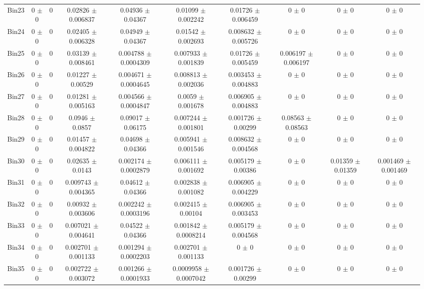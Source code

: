 \begin{tabular}{@{\extracolsep{4pt}}lccccccccc@{}}
     Bin23 & 0 $\pm$ 0 & 0 & 0.02826 $\pm$ 0.006837 & 0.04936 $\pm$ 0.04367 & 0.01099 $\pm$ 0.002242 & 0.01726 $\pm$ 0.006459 & 0 $\pm$ 0 & 0 $\pm$ 0 & 0 $\pm$ 0 \\ 
     Bin24 & 0 $\pm$ 0 & 0 & 0.02405 $\pm$ 0.006328 & 0.04949 $\pm$ 0.04367 & 0.01542 $\pm$ 0.002693 & 0.008632 $\pm$ 0.005726 & 0 $\pm$ 0 & 0 $\pm$ 0 & 0 $\pm$ 0 \\ 
     Bin25 & 0 $\pm$ 0 & 0 & 0.03139 $\pm$ 0.008461 & 0.004788 $\pm$ 0.0004309 & 0.007933 $\pm$ 0.001839 & 0.01726 $\pm$ 0.005459 & 0.006197 $\pm$ 0.006197 & 0 $\pm$ 0 & 0 $\pm$ 0 \\ 
     Bin26 & 0 $\pm$ 0 & 0 & 0.01227 $\pm$ 0.00529 & 0.004671 $\pm$ 0.0004645 & 0.008813 $\pm$ 0.002036 & 0.003453 $\pm$ 0.004883 & 0 $\pm$ 0 & 0 $\pm$ 0 & 0 $\pm$ 0 \\ 
     Bin27 & 0 $\pm$ 0 & 0 & 0.01281 $\pm$ 0.005163 & 0.004566 $\pm$ 0.0004847 & 0.0059 $\pm$ 0.001678 & 0.006905 $\pm$ 0.004883 & 0 $\pm$ 0 & 0 $\pm$ 0 & 0 $\pm$ 0 \\ 
     Bin28 & 0 $\pm$ 0 & 0 & 0.0946 $\pm$ 0.0857 & 0.09017 $\pm$ 0.06175 & 0.007244 $\pm$ 0.001801 & 0.001726 $\pm$ 0.00299 & 0.08563 $\pm$ 0.08563 & 0 $\pm$ 0 & 0 $\pm$ 0 \\ 
     Bin29 & 0 $\pm$ 0 & 0 & 0.01457 $\pm$ 0.004822 & 0.04698 $\pm$ 0.04366 & 0.005941 $\pm$ 0.001546 & 0.008632 $\pm$ 0.004568 & 0 $\pm$ 0 & 0 $\pm$ 0 & 0 $\pm$ 0 \\ 
     Bin30 & 0 $\pm$ 0 & 0 & 0.02635 $\pm$ 0.0143 & 0.002174 $\pm$ 0.0002879 & 0.006111 $\pm$ 0.001692 & 0.005179 $\pm$ 0.00386 & 0 $\pm$ 0 & 0.01359 $\pm$ 0.01359 & 0.001469 $\pm$ 0.001469 \\ 
     Bin31 & 0 $\pm$ 0 & 0 & 0.009743 $\pm$ 0.004365 & 0.04612 $\pm$ 0.04366 & 0.002838 $\pm$ 0.001082 & 0.006905 $\pm$ 0.004229 & 0 $\pm$ 0 & 0 $\pm$ 0 & 0 $\pm$ 0 \\ 
     Bin32 & 0 $\pm$ 0 & 0 & 0.00932 $\pm$ 0.003606 & 0.002242 $\pm$ 0.0003196 & 0.002415 $\pm$ 0.00104 & 0.006905 $\pm$ 0.003453 & 0 $\pm$ 0 & 0 $\pm$ 0 & 0 $\pm$ 0 \\ 
     Bin33 & 0 $\pm$ 0 & 0 & 0.007021 $\pm$ 0.004641 & 0.04522 $\pm$ 0.04366 & 0.001842 $\pm$ 0.0008214 & 0.005179 $\pm$ 0.004568 & 0 $\pm$ 0 & 0 $\pm$ 0 & 0 $\pm$ 0 \\ 
     Bin34 & 0 $\pm$ 0 & 0 & 0.002701 $\pm$ 0.001133 & 0.001294 $\pm$ 0.0002203 & 0.002701 $\pm$ 0.001133 & 0 $\pm$ 0 & 0 $\pm$ 0 & 0 $\pm$ 0 & 0 $\pm$ 0 \\ 
     Bin35 & 0 $\pm$ 0 & 0 & 0.002722 $\pm$ 0.003072 & 0.001266 $\pm$ 0.0001933 & 0.0009958 $\pm$ 0.0007042 & 0.001726 $\pm$ 0.00299 & 0 $\pm$ 0 & 0 $\pm$ 0 & 0 $\pm$ 0 \\ 

\end{tabular}
